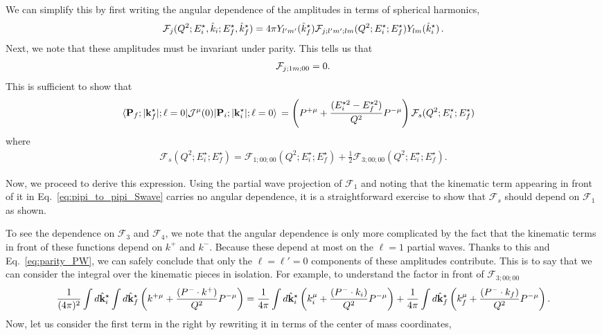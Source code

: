 We can simplify this by first writing the angular dependence of the amplitudes in terms of spherical harmonics, 
\begin{align}
{\cal F}_j(Q^2;E_i^\star,{\hat k}_i;E_f^\star,\hat{k}_f^\star)
=
4\pi  Y_{l^\prime m^\prime}(\hat{k}^\star_f){\cal F}_{j;l^\prime m^\prime;lm}(Q^2;E_i^\star;E_f^\star)Y_{l m}(\hat{k}^\star_i)\, .
\end{align}
Next, we note that these amplitudes must be invariant under parity. This tells us that 
\begin{align}
{\cal F}_{j;1 m;00}=0.
\label{eq:parity_PW}
\end{align}
This is sufficient to show that 
\begin{align}
\langle{\bf P}_f;|{\bf k}^\star_f|;\ell=0|{\cal J}^\mu(0)|{\bf P}_i;|{\bf k}^\star_i|;\ell=0\rangle\, 
&=
\left(P^{+\mu}+\frac{(E_i^{\star 2}-E_f^{\star 2})}{Q^2} P^{-\mu}\right)\mathcal{F}_{s}(Q^2;E_i^\star;E_f^\star)
\label{eq:pipi_to_pipi_swave}
\end{align}
where
\begin{align}
\mathcal{F}_{s}(Q^2;E_i^\star;E_f^\star)
=
\mathcal{F}_{1;00;00}(Q^2;E_i^\star;E_f^\star)
+\frac{1}{2}\mathcal{F}_{3;00;00}(Q^2;E_i^\star;E_f^\star).
\end{align}


Now, we proceed to derive this expression. Using the partial wave projection of $\mathcal{F}_{1}$ and noting that the kinematic term appearing in front of it in Eq.~\ref{eq:pipi_to_pipi_Swave} carries no angular dependence, it is a straightforward exercise to show that $\mathcal{F}_{s}$ should depend on $\mathcal{F}_{1}$ as shown. 

To see the dependence on  $\mathcal{F}_{3}$ and  $\mathcal{F}_{4}$, we note that the angular dependence is only more complicated by the fact that the kinematic terms in front of these functions depend on $k^+$ and $k^-$. Because these depend at most on the $\ell=1$ partial waves. Thanks to this and Eq.~\ref{eq:parity_PW}, we can safely conclude that only the $\ell=\ell'=0$ components of these amplitudes contribute. This is to say that we can consider the integral over the kinematic pieces in isolation. For example, to understand the factor in front of $\mathcal{F}_{3;00;00}$ 
\begin{align}
\frac{1}{(4\pi)^2}\int d\hat{\bf k}^\star_i\int d\hat{\bf k}^\star_f
\left(k^{+\mu}+\frac{(P^-\cdot k^{+})}{Q^2} P^{-\mu}\right)
=
\frac{1}{4\pi}\int d\hat{\bf k}^\star_i
\left(k^{\mu}_i+\frac{(P^-\cdot k_i)}{Q^2} P^{-\mu}\right)
+
\frac{1}{4\pi}\int d\hat{\bf k}^\star_f
\left(k^{\mu}_f+\frac{(P^-\cdot k_f)}{Q^2} P^{-\mu}\right).
\end{align}
Now, let us consider the first term in the right by rewriting it in terms of the center of mass coordinates,  

